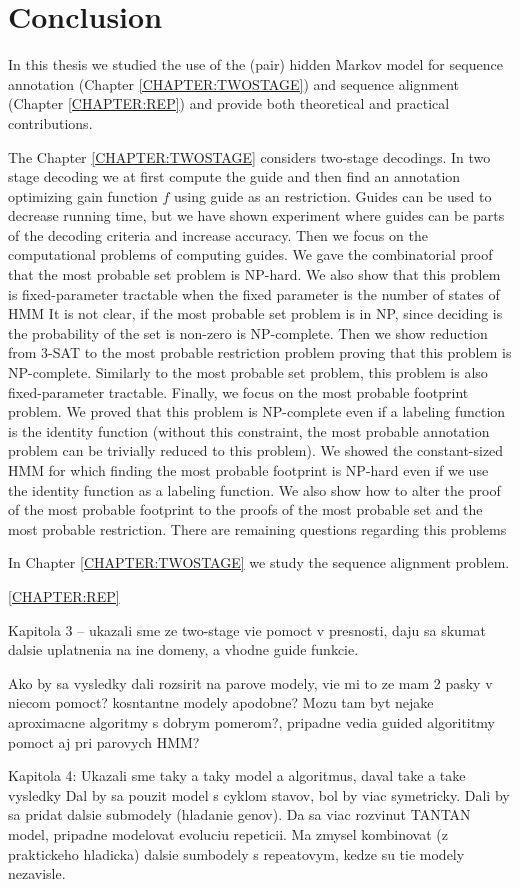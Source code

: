 \chapter{Conclusion}

In this thesis we studied the use of the (pair) hidden Markov model for
sequence annotation (Chapter \ref{CHAPTER:TWOSTAGE}) and sequence alignment
(Chapter \ref{CHAPTER:REP}) and provide both theoretical and practical
contributions.

The Chapter \ref{CHAPTER:TWOSTAGE} considers two-stage decodings. In two stage
decoding we at first compute the guide and then find an annotation optimizing
gain function $f$ using guide as an restriction. Guides can be used to decrease
running time, but we have shown experiment where guides can be parts of the
decoding criteria and increase accuracy. Then we focus on the computational problems of computing guides.
We gave the combinatorial proof that the most probable set problem is NP-hard.
We also show that this problem is fixed-parameter tractable when the fixed
parameter is the number of states of HMM It is not clear, if the most probable
set problem is in NP, since deciding is the probability of the set is non-zero
is NP-complete. Then we show reduction from 3-SAT to the most probable
restriction problem proving that this problem is NP-complete. Similarly to the
most probable set problem, this problem is also fixed-parameter tractable.
Finally, we focus on the most probable footprint problem. We proved that this
problem is NP-complete even if a labeling function is the identity function
(without this constraint, the most probable annotation problem can be trivially
reduced to this problem). We showed the constant-sized HMM for which finding
the most probable footprint is NP-hard even if we use the identity function as
a labeling function. We also show how to alter the proof of the most probable
footprint to the proofs of the most probable set and the most probable
restriction. There are remaining questions regarding this problems

In Chapter \ref{CHAPTER:TWOSTAGE} we study the sequence alignment problem.

\ref{CHAPTER:REP}
\begin{reformulate*}
Kapitola 3 -- ukazali sme ze two-stage vie pomoct v presnosti, 
daju sa skumat dalsie uplatnenia na ine domeny, a vhodne guide funkcie.

Ako by sa vysledky dali rozsirit na parove modely, vie mi to ze mam 2 pasky v niecom pomoct? kosntantne modely  apodobne? Mozu tam byt nejake aproximacne algoritmy s dobrym pomerom?, pripadne vedia guided
algorititmy pomoct aj pri parovych HMM? 

Kapitola 4: Ukazali sme taky a taky model a algoritmus, daval take a take vysledky  Dal by sa pouzit model s cyklom
stavov, bol by viac symetricky. Dali by sa pridat dalsie submodely (hladanie
genov). Da sa viac rozvinut TANTAN model, pripadne modelovat evoluciu
repeticii. Ma zmysel kombinovat (z praktickeho hladicka) dalsie sumbodely s
repeatovym, kedze su tie modely nezavisle.

\end{reformulate*}
\label{LastPage}
